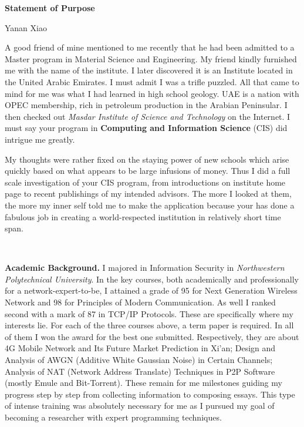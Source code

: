 \documentclass[a4paper]{article}
\begin{document}
\begin{center}
\textbf{Statement of Purpose}
\end{center}
\begin{center}
Yanan Xiao
\end{center}
\par

\par
\noindent A good friend of mine mentioned to me recently that he had been admitted to a Master program in Material Science and Engineering. My friend kindly furnished me with the name of the institute. I later discovered it is an Institute located in the United Arabic Emirates. I must admit I was a trifle puzzled. All that came to mind for me was what I had learned in high school geology. UAE is a nation with OPEC membership, rich in petroleum production in the Arabian Peninsular. I then checked out \emph{Masdar Institute of Science and Technology} on the Internet. I must say your program in \textbf{Computing and Information Science} (CIS) did intrigue me greatly.
\par
My thoughts were rather fixed on the staying power of new schools which arise quickly based on what appears to be large infusions of money. Thus I did a full scale investigation of your CIS program, from introductions on institute home page to recent publishings of my intended advisors. The more I looked at them, the more my inner self told me to make the application because your has done a fabulous job in creating a world-respected institution in relatively short time span.
\par
~
\par
\noindent \textbf{Academic Background.} I majored in Information Security in
\emph{Northwestern Polytechnical University}. In the key courses, both academically and professionally for a network-expert-to-be, I attained a grade of 95 for Next Generation Wireless Network and 98 for Principles of Modern Communication. As well I ranked second with a mark of 87 in TCP/IP Protocols. These are specifically where my interests lie. For each of the three courses above, a term paper is required. In all of them I won the award for the best one submitted. Respectively, they are about 4G Mobile Network and Its Future Market Prediction in Xi'an; Design and Analysis of AWGN (Additive White Gaussian Noise) in Certain Channels; Analysis of NAT (Network Address Translate) Techniques in P2P Software (mostly Emule and Bit-Torrent). These remain for me milestones guiding my progress step by step from collecting information to composing essays. This type of intense training was absolutely necessary for me as I pursued my goal of becoming a researcher with expert programming techniques.
\end{document}
